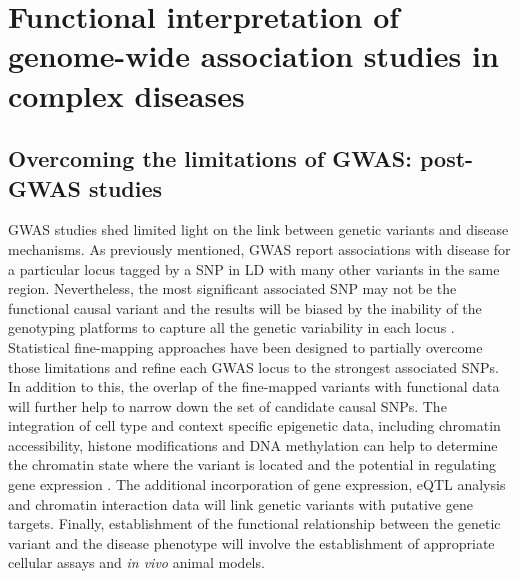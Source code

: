 

	


\section{Functional interpretation of genome-wide association studies in complex diseases}

\subsection{Overcoming the limitations of GWAS: post-GWAS studies}
GWAS studies shed limited light on the link between genetic variants and disease mechanisms. As previously mentioned, GWAS report associations with disease for a particular locus tagged by a SNP in LD with many other variants in the same region. Nevertheless, the most significant associated SNP may not be the functional causal variant and the results will be biased by the inability of the genotyping platforms to capture all the genetic variability in each locus . Statistical fine-mapping approaches have been designed to partially overcome those limitations and refine each GWAS locus to the strongest associated SNPs. In addition to this, the overlap of the fine-mapped variants with functional data will further help to narrow down the set of candidate causal SNPs. The integration of cell type and context specific epigenetic data, including chromatin accessibility, histone modifications and DNA methylation can help to determine the chromatin state where the variant is located and the potential in regulating gene expression . The additional incorporation of gene expression, eQTL analysis and chromatin interaction data will link genetic variants with putative gene targets. Finally, establishment of the functional relationship between the genetic variant and the disease phenotype will involve the establishment of appropriate cellular assays and \textit{in vivo} animal models.


